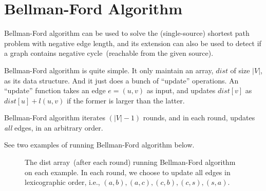 \setcounter{definition}{0} \setcounter{property}{0} \setcounter{claim}{0} \setcounter{fact}{0} \setcounter{corollary}{0} \setcounter{figure}{0}
\section{Bellman-Ford Algorithm}

Bellman-Ford algorithm can be used to solve the (single-source) shortest path problem with negative edge length,
and its extension can also be used to detect if a graph contains negative cycle~(reachable from the given source).

Bellman-Ford algorithm is quite simple. It only maintain an array, 
$dist$ of size $|V|$, as its data structure. And it just does a bunch of ``update'' operations.
An ``update'' function takes an edge $e = (u,v)$ as input, and updates $dist[v]$ as $dist[u] + l(u,v)$ if
the former is larger than the latter.  

\begin{minipage}{0.8\textwidth}
	\xxx
	\xxx
	\xxx
	\xxx
	\xxx
\end{minipage}


Bellman-Ford algorithm iterates $(|V| - 1)$ rounds, and in each round, updates \emph{all} edges, in an arbitrary order.

\begin{minipage}{0.8\textwidth}
	\xxx
	\xxx
	\xxx
	\xxx
	\xxx
	\xxx
	\xxx
	\xxx
	\xxx
\end{minipage}


See two examples of running Bellman-Ford algorithm below.

\begin{figure}[h]
\centering{}
\caption{The dist array~(after each round) running Bellman-Ford algorithm on each example.
In each round, we choose to update all edges in lexicographic order, i.e., $(a,b), (a,c), (c,b),(c,s),(s,a)$.}
\end{figure}


